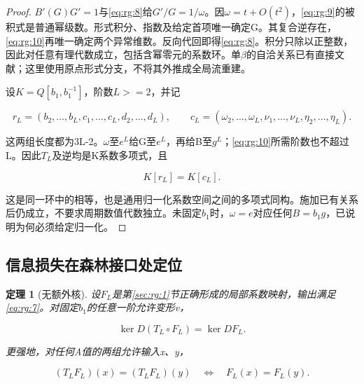\documentclass[11pt,a4paper,oneside]{ctexart}
\theoremstyle{cnplain}
\newtheorem{theorem}{定理}[section]
\theoremstyle{definition}
\theoremstyle{remark}
\numberwithin{equation}{section}
\begin{document}
\begin{proof}

\(B'(G)G'=1\)与\eqref{eq:rg:8}给\(G'/G=1/\omega\)。因\(\omega =t+O(t^{2})\)，\eqref{eq:rg:9}的被积式是普通幂级数。形式积分、指数及给定首项唯一确定G。其复合逆存在，\eqref{eq:rg:10}再唯一确定两个异常维数。反向代回即得\eqref{eq:rg:8}。积分只除以正整数，因此对任意有理代数成立，包括含幂零元的系数环。单\(\beta\)的自洽关系已有直接文献\cite[eq.(3)]{antipin}；这里使用原点形式分支，不将其外推成全局流重建。

设\(K=Q[b_1,b_1^{-1}]\)，阶数\(L>=2\)，并记

\begin{equation}
r_L=(b_2,\ldots,b_L,c_1,\ldots,c_L,d_2,\ldots,d_L),\qquad
 c_L=(\omega_2,\ldots,\omega_L,\nu_1,\ldots,\nu_L,
                    \eta_2,\ldots,\eta_L).
\end{equation}

这两组长度都为3L-2。\(\omega\)至\(e^L\)给G至\(e^L\)，再给B至\(g^L\)；\eqref{eq:rg:10}所需阶数也不超过L。因此\(T_L\)及逆均是K系数多项式，且

\begin{equation}
K[r_L]=K[c_L].                                    \label{eq:rg:11}
\end{equation}

这是同一环中的相等，也是通用归一化系数空间之间的多项式同构。施加已有关系后仍成立，不要求周期数值代数独立。未固定\(b_1\)时，\(\omega =e\)对应任何\(B=b_1g\)，已说明为何必须给定归一化。

\end{proof}


\subsection{信息损失在森林接口处定位}\label{sec:rg:5}

\begin{theorem}[无额外核]

\label{thm:rg:5.1} 设\(F_L\)是第\ref{sec:rg:1}节正确形成的局部系数映射，输出满足\eqref{eq:rg:7}。对固定\(b_1\)的任意一阶允许变形v，

\begin{equation}
\ker D(T_L\circ F_L)=\ker DF_L.                   \label{eq:rg:12}
\end{equation}

更强地，对任何A值的两组允许输入x、y，

\begin{equation}
(T_LF_L)(x)=(T_LF_L)(y)
       \quad\Longleftrightarrow\quad F_L(x)=F_L(y). \label{eq:rg:13}
\end{equation}

\end{theorem}
\end{document}
